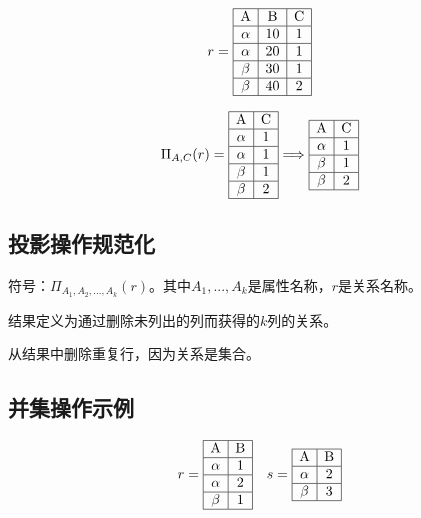\[
r=\begin{array}{|c|c|c|}
    \hline
    \mathrm{A} & \mathrm{B} & \mathrm{C} \\ \hline
    \alpha & 10 & 1 \\ \hline
    \alpha & 20 & 1 \\ \hline
    \beta & 30 & 1 \\ \hline
    \beta & 40 & 2 \\ \hline
\end{array}
\]

\[
\Pi_{A,C}(r)=\begin{array}{|c|c|}
 \hline
 \mathrm{A} & \mathrm{C} \\ \hline
 \alpha & 1\\ \hline
 \alpha & 1 \\ \hline
 \beta & 1 \\ \hline
 \beta & 2\\ \hline   
\end{array}\Longrightarrow 
\begin{array}{|c|c|}
    \hline
    \mathrm{A} & \mathrm{C} \\ \hline
    \alpha & 1\\ \hline
    \beta & 1\\ \hline
    \beta & 2\\ \hline
\end{array}
\]

\subsection{投影操作规范化}

符号：$\Pi_{A_1,A_2,...,A_k}(r)$。其中$A_1,...,A_k$是属性名称，$r$是关系名称。

结果定义为通过删除未列出的列而获得的$k$列的关系。

从结果中删除重复行，因为关系是集合。

\subsection{并集操作示例}

\[
r = \begin{array}{|c|c|}
    \hline
    \mathrm{A} & \mathrm{B} \\ \hline
    \alpha & 1\\ \hline
    \alpha & 2\\ \hline
    \beta & 1\\ \hline
\end{array}
\quad 
s = \begin{array}{|c|c|}
    \hline
    \mathrm{A} & \mathrm{B} \\ \hline
    \alpha & 2\\ \hline
    \beta & 3 \\ \hline
\end{array}
\]

